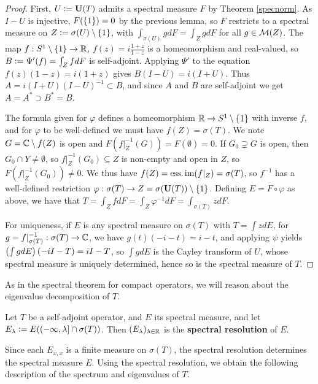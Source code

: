 \documentclass[10pt]{amsart}
\begin{document}
\begin{proof}
    First, $U \vcentcolon= \mathbf{U}(T)$ admits a spectral measure $F$ by Theorem \ref{specnorm}. As $I - U$ is injective, $F(\left\{  1  \right\}) = 0$ by the previous lemma, so $F$ restricts to a spectral measure on $Z \vcentcolon= \sigma(U) \setminus \left\{  1  \right\}$, with $\int_{\sigma(U)} g dF = \int_Z g dF$ for all $g \in \mathcal{M}(Z)$. The map $f : S^1 \setminus \left\{  1  \right\} \to \mathbb{R}$, $f(z) = i\frac{1 + z}{1 - z}$ is a homeomorphism and real-valued, so $B \vcentcolon= \Psi'(f) = \int_Z f dF$ is self-adjoint. Applying $\Psi'$ to the equation $f(z)(1 - z) = i(1 + z)$ gives $B(I - U) = i(I + U)$. Thus $A = i(I + U)(I - U)^{-1} \subset B$, and since $A$ and $B$ are self-adjoint we get $A = A^* \supset B^* = B$.

    The formula given for $\varphi$ defines a homeomorphism $\mathbb{R} \to S^1 \setminus \left\{  1  \right\}$ with inverse $f$, and for $\varphi$ to be well-defined we must have $f(Z) = \sigma(T)$. We note $G = \mathbb{C} \setminus f(Z)$ is open and $F(f|_Z^{-1}(G)) = F(\emptyset) = 0$. If $G_0 \supsetneq G$ is open, then $G_0 \cap Y \neq \emptyset$, so $f|_Z^{-1}(G_0) \subseteq Z$ is non-empty and open in $Z$, so $F(f|_Z^{-1}(G_0)) \neq 0$. We thus have $f(Z) = \operatorname{ess.im}(f|_Z) = \sigma(T)$, so $f^{-1}$ has a well-defined restriction $\varphi : \sigma(T) \to Z = \sigma(\mathbf{U}(T)) \setminus \left\{  1  \right\}$. Defining $E = F \circ \varphi$ as above, we have that $T = \int_Z f dF = \int_Z \varphi^{-1} dF = \int_{\sigma(T)} z dF$.

    For uniqueness, if $E$ is any spectral measure on $\sigma(T)$ with $T = \int z dE$, for $g = f|_{\sigma(T)}^{-1} : \sigma(T) \to \mathbb{C}$, we have $g(t)(-i - t) = i - t$, and applying $\psi$ yields $\left(  \int g dE  \right)(-iI - T) = iI - T$, so $\int g dE$ is the Cayley transform of $U$, whose spectral measure is uniquely determined, hence so is the spectral measure of $T$.
\end{proof}
As in the spectral theorem for compact operators, we will reason about the eigenvalue decomposition of $T$. 
\begin{definition}
    Let $T$ be a self-adjoint operator, and $E$ its spectral measure, and let $E_\lambda \vcentcolon= E((-\infty, \lambda] \cap \sigma(T))$. Then $(E_\lambda)_{\lambda \in \mathbb{R}}$ is the \textbf{spectral resolution} of $E$.
\end{definition}
Since each $E_{x, x}$ is a finite measure on $\sigma(T)$, the spectral resolution determines the spectral measure $E$. Using the spectral resolution, we obtain the following description of the spectrum and eigenvalues of $T$.
\end{document}
